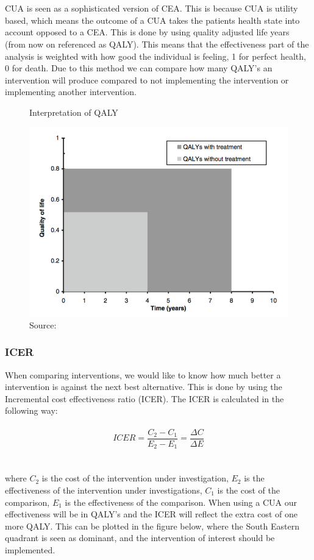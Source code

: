 \documentclass[a4paper,12pt]{article}
\begin{document}
\\\\
CUA is seen as a sophisticated version of CEA. This is because CUA is utility based, which means the outcome of a CUA takes the patients health state into account opposed to a CEA. This is done by using quality adjusted life years (from now on referenced as QALY). This means that the effectiveness part of the analysis is weighted with how good the individual is feeling, 1 for perfect health, 0 for death. Due to this method we can compare how many QALY’s an intervention will produce compared to not implementing the intervention or implementing another intervention. 

\begin{figure} [h]
	\centering
	\caption{Interpretation of QALY}
	\label{fig:qaly}
	\includegraphics[width=0.7\linewidth]{Pictures/QALY}
	\caption*{Source:  \cite{CUAbog} }
\end{figure}

\subsubsection*{ICER}
When comparing interventions, we would like to know how much better a intervention is against the next best alternative. This is done by using the Incremental cost effectiveness ratio (ICER). The ICER is calculated in the following way: 
\\\\
\begin{equation} ICER=\dfrac{C_2-C_1}{E_2-E_1} =\dfrac{\varDelta C}{\varDelta E}
\end{equation}
\\\\
where $ C_2$ is the cost of the intervention under investigation, $ E_2$ is the effectiveness of the intervention under investigations, $ C_1$ is the cost of the comparison, $ E_1$ is the effectiveness of the comparison. When using a CUA our effectiveness will be in QALY’s and the ICER will reflect the extra cost of one more QALY. This can be plotted in the figure below, where the South Eastern quadrant is seen as dominant, and the intervention of interest should be implemented. 
\end{document}
